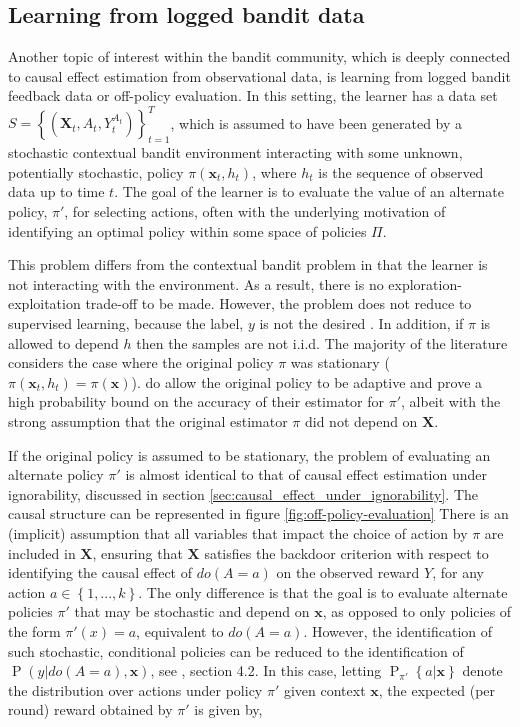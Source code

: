 \documentclass[11pt,a4paper,oneside]{book}
\newcommand{\Pns}[2]{\operatorname{P}_{#1}\left\{#2\right\}}
\newcommand{\set}[1]{\left\{#1\right\}}
\renewcommand{\P}[1]{\operatorname{P}\left(#1\right)}
\newcommand{\cfb}[2]{{#1}_t^{#2}} %
\renewcommand{\vec}[1]{\boldsymbol{#1}}
\theoremstyle{plain}
\theoremstyle{definition}
\begin{document}
\subsection{Learning from logged bandit data}
Another topic of interest within the bandit community, which is deeply connected to causal effect estimation from observational data, is learning from logged bandit feedback data or off-policy evaluation\citep{Langford2008a,strehl2010learning,Li2010,Dudik2011,Bottou2013,Swaminathan2015}. In this setting, the learner has a data set $S = \set{(\vec{X}_t,A_t,\cfb{Y}{A_t})}_{t=1}^T$, which is assumed to have been generated by a stochastic contextual bandit environment interacting with some unknown, potentially stochastic, policy $\pi(\vec{x}_t,h_t)$, where $h_t$ is the sequence of observed data up to time $t$. The goal of the learner is to evaluate the value of an alternate policy, $\pi'$, for selecting actions, often with the underlying motivation of identifying an optimal policy within some space of policies $\Pi$. 

This problem differs from the contextual bandit problem in that the learner is not interacting with the environment. As a result, there is no exploration-exploitation trade-off to be made. However, the problem does not reduce to supervised learning, because the label, $y$ is not the desired . In addition, if $\pi$ is allowed to depend $h$ then the samples are not i.i.d. The majority of the literature considers the case where the original policy $\pi$ was stationary ($\pi(\vec{x}_t,h_t) = \pi(\vec{x})$). \citet{Langford2008a} do allow the original policy to be adaptive and prove a high probability bound on the accuracy of their estimator for $\pi'$, albeit with the strong assumption that the original estimator $\pi$ did not depend on $\vec{X}$. 

If the original policy is assumed to be stationary, the problem of evaluating an alternate policy $\pi'$ is almost identical to that of causal effect estimation under ignorability, discussed in section \ref{sec:causal_effect_under_ignorability}. The causal structure can be represented in figure \ref{fig:off-policy-evaluation} There is an (implicit) assumption that all variables that impact the choice of action by $\pi$ are included in $\vec{X}$, ensuring that $\vec{X}$ satisfies the backdoor criterion with respect to identifying the causal effect of $do(A = a)$ on the observed reward $Y$, for any action $a \in \set{1,...,k}$. The only difference is that the goal is to evaluate alternate policies $\pi'$ that may be stochastic and depend on $\vec{x}$, as opposed to only policies of the form $\pi'(x) = a$, equivalent to $do(A=a)$. However, the identification of such stochastic, conditional policies can be reduced to the identification of $\P{y|do(A=a),\vec{x}}$, see \citet{Pearl2000}, section 4.2. In this case, letting $\Pns{\pi'}{a|\vec{x}}$ denote the distribution over actions under policy $\pi'$ given context $\vec{x}$, the expected (per round) reward obtained by $\pi'$ is given by,
\end{document}

